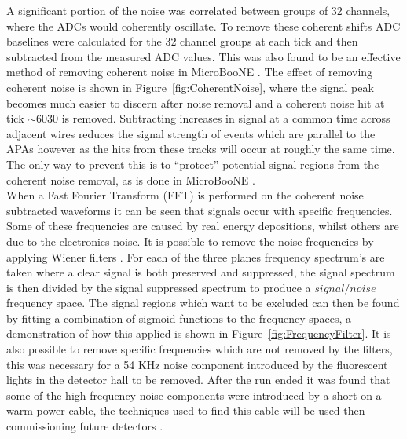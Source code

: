 A significant portion of the noise was correlated between groups of 32 channels, where the ADCs would coherently oscillate. To remove these coherent shifts ADC baselines were calculated for the 32 channel groups at each tick and then subtracted from the measured ADC values. This was also found to be an effective method of removing coherent noise in MicroBooNE \citep{uBooNENoise}. The effect of removing coherent noise is shown in Figure~\ref{fig:CoherentNoise}, where the signal peak becomes much easier to discern after noise removal and a coherent noise hit at tick $\sim$6030 is removed. Subtracting increases in signal at a common time across adjacent wires reduces the signal strength of events which are parallel to the APAs however as the hits from these tracks will occur at roughly the same time. The only way to prevent this is to ``protect'' potential signal regions from the coherent noise removal, as is done in MicroBooNE \citep{uBooNENoise}. \\

When a Fast Fourier Transform (FFT) \citep{CoTuFFT} is performed on the coherent noise subtracted waveforms it can be seen that signals occur with specific frequencies. Some of these frequencies are caused by real energy depositions, whilst others are due to the electronics noise. It is possible to remove the noise frequencies by applying Wiener filters \citep{WienerFilter}. For each of the three planes frequency spectrum's are taken where a clear signal is both preserved and suppressed, the signal spectrum is then divided by the signal suppressed spectrum to produce a $signal/noise$ frequency space. The signal regions which want to be excluded can then be found by fitting a combination of sigmoid functions to the frequency spaces, a demonstration of how this applied is shown in Figure~\ref{fig:FrequencyFilter}. It is also possible to remove specific frequencies which are not removed by the filters, this was necessary for a 54 KHz noise component introduced by the fluorescent lights in the detector hall to be removed. After the run ended it was found that some of the high frequency noise components were introduced by a short on a warm power cable, the techniques used to find this cable will be used then commissioning future detectors \citep{35tonNoiseMeeting}. \\

